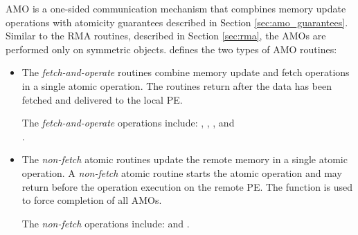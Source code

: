 \label{sec:amo}
\ac{AMO} is a one-sided communication mechanism that compbines memory update operations with atomicity guarantees described in Section \ref{sec:amo_guarantees}. 
Similar to the \ac{RMA} routines, described in Section \ref{sec:rma},
the \acp{AMO} are performed only on symmetric objects. 
\openshmem{} defines the two types of \ac{AMO} routines:
\begin{itemize}
\item %
The \textit{fetch-and-operate} routines combine memory update and fetch 
operations in a single atomic operation.
The routines return after the data has been fetched and delivered to the local \ac{PE}.

The \textit{fetch-and-operate} operations include: , , , and\\ .

\item %
The \textit{non-fetch} atomic routines update the remote memory 
in a single atomic operation.
A \textit{non-fetch} atomic routine
starts the atomic operation and may return before the operation execution
on the remote \ac{PE}.
The  function is used to force completion of all \acp{AMO}.

The \textit{non-fetch} operations include:  and .
\end{itemize}
